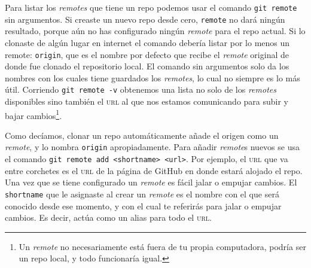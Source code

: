 \documentclass[spanish, 12pt, a4paper]{article}
\begin{document}
Para listar los \textit{remotes} que tiene un repo podemos usar el comando \texttt{git remote} sin argumentos.
Si creaste un nuevo repo desde cero, \texttt{remote} no dará ningún resultado, porque aún no has configurado ningún \textit{remote} para el repo actual.
Si lo clonaste de algún lugar en internet el comando debería listar por lo menos un remote: \texttt{origin}, que es el nombre por defecto que recibe el \textit{remote} original de donde fue clonado el repositorio local.
El comando sin argumentos solo da los nombres con los cuales tiene guardados los \textit{remotes}, lo cual no siempre es lo más útil.
Corriendo \texttt{git remote -v} obtenemos una lista no solo de los \textit{remotes} disponibles sino también el \textsc{url} al que nos estamos comunicando para subir y bajar cambios\footnote{Un \textit{remote} no necesariamente está fuera de tu propia computadora, podría ser un repo local, y todo funcionaría igual.}.

Como decíamos, clonar un repo automáticamente añade el origen como un \textit{remote}, y lo nombra \texttt{origin} apropiadamente.
Para añadir \textit{remote}s nuevos se usa el comando \texttt{git remote add <shortname> <url>}.
Por ejemplo, el \textsc{url} que va entre corchetes es el \textsc{url} de la página de GitHub en donde estará alojado el repo.
Una vez que se tiene configurado un \textit{remote} es fácil jalar o empujar cambios.
El \texttt{shortname} que le asignaste al crear un \textit{remote} es el nombre con el que será conocido desde ese momento, y con el cual te referirás para jalar o empujar cambios.
Es decir, actúa como un alias para todo el \textsc{url}.
\end{document}

